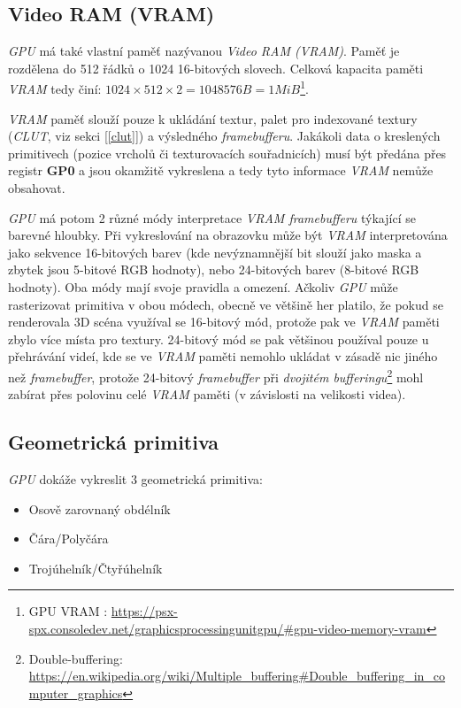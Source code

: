 \subsection{Video RAM (VRAM)}

\textit{GPU} má také vlastní paměť nazývanou \textit{Video RAM (VRAM)}. Paměť je rozdělena do 512 řádků o 1024 16-bitových slovech.
Celková kapacita paměti \textit{VRAM} tedy činí: $1024 \times 512 \times 2 = 1048576 B = 1 MiB$\footnote{GPU VRAM \cite{PSXSpec}: \url{https://psx-spx.consoledev.net/graphicsprocessingunitgpu/\#gpu-video-memory-vram}}. 

\textit{VRAM} paměť slouží pouze k ukládání textur, palet pro
indexované textury (\textit{CLUT}, viz sekci [\ref{clut}]) a výsledného \textit{framebufferu}. Jakákoli data o kreslených primitivech (pozice vrcholů či texturovacích souřadnicích)
musí být předána přes registr \textbf{GP0} a jsou okamžitě vykreslena a tedy tyto informace \textit{VRAM} nemůže obsahovat. 

\textit{GPU} má potom 2 různé módy interpretace \textit{VRAM framebufferu} týkající se barevné hloubky. Při vykreslování
na obrazovku může být \textit{VRAM} interpretována jako sekvence 16-bitových barev (kde nevýznamnější bit slouží jako maska a zbytek jsou 5-bitové RGB hodnoty), nebo
24-bitových barev (8-bitové RGB hodnoty). Oba módy mají svoje pravidla a omezení. Ačkoliv \textit{GPU} může rasterizovat primitiva v obou módech, obecně
ve většině her platilo, že pokud se renderovala 3D scéna využíval se 16-bitový mód, protože pak ve \textit{VRAM} paměti zbylo více místa pro textury. 24-bitový mód se
pak většinou používal pouze u přehrávání videí, kde se ve \textit{VRAM} paměti nemohlo ukládat v zásadě nic jiného než \textit{framebuffer}, protože 24-bitový \textit{framebuffer} při \textit{dvojitém bufferingu}\footnote{Double-buffering: \linebreak \url{https://en.wikipedia.org/wiki/Multiple_buffering\#Double_buffering_in_computer_graphics}}
mohl zabírat přes polovinu celé \textit{VRAM} paměti (v závislosti na velikosti videa). 

\subsection{Geometrická primitiva}

\textit{GPU} dokáže vykreslit 3 geometrická primitiva:

\begin{itemize}
    \item{Osově zarovnaný obdélník}
    \item{Čára/Polyčára}
    \item{Trojúhelník/Čtyřúhelník}
\end{itemize}

